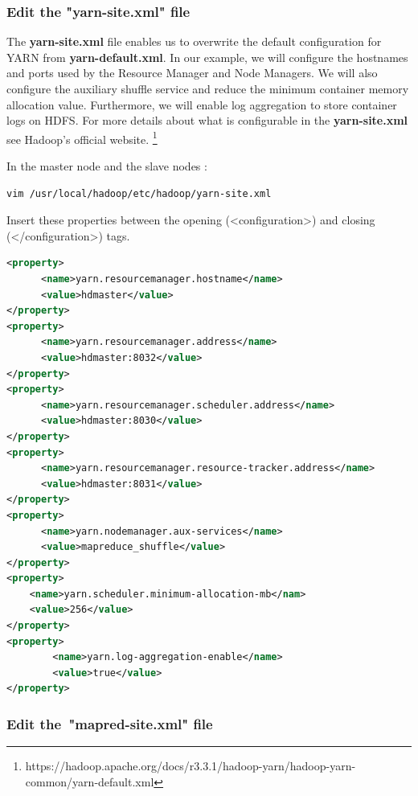 \documentclass[12pt,english]{book}
\begin{document}
\subsubsection{Edit the "yarn-site.xml" file}


The \textbf{yarn-site.xml} file enables us to overwrite the default configuration for YARN from \textbf{yarn-default.xml}.
In our example, we will configure the hostnames and ports used by the Resource Manager and Node Managers.
We will also configure the auxiliary shuffle service and reduce the minimum container memory allocation value.
Furthermore, we will enable log aggregation to store container logs on HDFS.
For more details about what is configurable in the \textbf{yarn-site.xml} see Hadoop's official website.
\footnote{https://hadoop.apache.org/docs/r3.3.1/hadoop-yarn/hadoop-yarn-common/yarn-default.xml}

In the master node and the slave nodes :
\begin{lstlisting}[language=bash, frame=single]
vim /usr/local/hadoop/etc/hadoop/yarn-site.xml 
\end{lstlisting}
Insert these properties between the opening (<configuration>) and closing (</configuration>) tags. 
\begin{lstlisting}[language=xml, frame=single]
<property>
      <name>yarn.resourcemanager.hostname</name>
      <value>hdmaster</value>
</property>
<property>
      <name>yarn.resourcemanager.address</name>
      <value>hdmaster:8032</value>
</property>
<property>
      <name>yarn.resourcemanager.scheduler.address</name>
      <value>hdmaster:8030</value>
</property>
<property>
      <name>yarn.resourcemanager.resource-tracker.address</name>
      <value>hdmaster:8031</value>
</property>
<property>
      <name>yarn.nodemanager.aux-services</name>
      <value>mapreduce_shuffle</value>
</property>
<property>
	<name>yarn.scheduler.minimum-allocation-mb</nam>
	<value>256</value>
</property>
<property>
        <name>yarn.log-aggregation-enable</name>
        <value>true</value>
</property>
\end{lstlisting}


\subsubsection{Edit the "mapred-site.xml" file}
\end{document}
